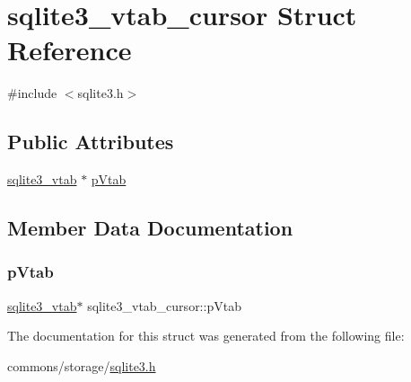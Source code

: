 \hypertarget{structsqlite3__vtab__cursor}{}\section{sqlite3\+\_\+vtab\+\_\+cursor Struct Reference}
\label{structsqlite3__vtab__cursor}


{\ttfamily \#include $<$sqlite3.\+h$>$}

\subsection*{Public Attributes}
\begin{DoxyCompactItemize}
\item 
\mbox{\hyperlink{structsqlite3__vtab}{sqlite3\+\_\+vtab}} $\ast$ \mbox{\hyperlink{structsqlite3__vtab__cursor_a2989d9f84a35506c3ef9fe9e9ecd3365}{p\+Vtab}}
\end{DoxyCompactItemize}


\subsection{Member Data Documentation}
\mbox{\label{structsqlite3__vtab__cursor_a2989d9f84a35506c3ef9fe9e9ecd3365}} 
\subsubsection{\texorpdfstring{pVtab}{pVtab}}
{\footnotesize\ttfamily \mbox{\hyperlink{structsqlite3__vtab}{sqlite3\+\_\+vtab}}$\ast$ sqlite3\+\_\+vtab\+\_\+cursor\+::p\+Vtab}



The documentation for this struct was generated from the following file\+:\begin{DoxyCompactItemize}
\item 
commons/storage/\mbox{\hyperlink{sqlite3_8h}{sqlite3.\+h}}\end{DoxyCompactItemize}
